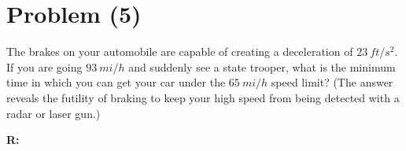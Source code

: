 \section{Problem (5)}
	The brakes on your automobile are capable of creating a deceleration of $23 \ ft/s^{2}$. If you are going $93 \ mi/h$ and suddenly see a state trooper, what is the minimum time in which you can get your car under the $65 \ mi/h$ speed limit? (The answer reveals the futility of braking to keep your high speed from being detected with a radar or laser gun.)

	\textbf{R:} \newline
